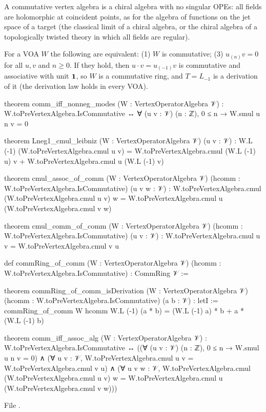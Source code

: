 \begin{physics}
A commutative vertex algebra is a chiral algebra with no singular OPEs: all fields are holomorphic
at coincident points, as for the algebra of functions on the jet space of a target (the classical
limit of a chiral algebra, or the chiral algebra of a topologically twisted theory in which all
fields are regular).
\end{physics}

\begin{theorem}\label{l03:thm:commalg}
For a VOA $W$ the following are equivalent: (1) $W$ is commutative; (3) $u_{(n)}v = 0$ for all
$u,v$ and $n\ge0$. If they hold, then $u\cdot v = u_{(-1)}v$ is commutative and associative with
unit $\mathbf{1}$, so $W$ is a commutative ring, and $T = L_{-1}$ is a derivation of it (the derivation
law holds in every VOA).
\end{theorem}
\begin{leancode}
theorem comm_iff_nonneg_modes (W : VertexOperatorAlgebra 𝒱) :
    W.toPreVertexAlgebra.IsCommutative ↔ ∀ (u v : 𝒱) (n : ℤ), 0 ≤ n → W.smul u n v = 0

theorem Lneg1_cmul_leibniz (W : VertexOperatorAlgebra 𝒱) (u v : 𝒱) :
    W.L (-1) (W.toPreVertexAlgebra.cmul u v)
      = W.toPreVertexAlgebra.cmul (W.L (-1) u) v + W.toPreVertexAlgebra.cmul u (W.L (-1) v)

theorem cmul_assoc_of_comm (W : VertexOperatorAlgebra 𝒱)
    (hcomm : W.toPreVertexAlgebra.IsCommutative) (u v w : 𝒱) :
    W.toPreVertexAlgebra.cmul (W.toPreVertexAlgebra.cmul u v) w
      = W.toPreVertexAlgebra.cmul u (W.toPreVertexAlgebra.cmul v w)

theorem cmul_comm_of_comm (W : VertexOperatorAlgebra 𝒱)
    (hcomm : W.toPreVertexAlgebra.IsCommutative) (u v : 𝒱) :
    W.toPreVertexAlgebra.cmul u v = W.toPreVertexAlgebra.cmul v u

def commRing_of_comm (W : VertexOperatorAlgebra 𝒱)
    (hcomm : W.toPreVertexAlgebra.IsCommutative) : CommRing 𝒱 :=

theorem commRing_of_comm_isDerivation (W : VertexOperatorAlgebra 𝒱)
    (hcomm : W.toPreVertexAlgebra.IsCommutative) (a b : 𝒱) :
    letI := commRing_of_comm W hcomm
    W.L (-1) (a * b) = (W.L (-1) a) * b + a * (W.L (-1) b)

theorem comm_iff_assoc_alg (W : VertexOperatorAlgebra 𝒱) :
    W.toPreVertexAlgebra.IsCommutative ↔
      ((∀ (u v : 𝒱) (n : ℤ), 0 ≤ n → W.smul u n v = 0)
        ∧ (∀ u v : 𝒱, W.toPreVertexAlgebra.cmul u v = W.toPreVertexAlgebra.cmul v u)
        ∧ (∀ u v w : 𝒱, W.toPreVertexAlgebra.cmul (W.toPreVertexAlgebra.cmul u v) w
              = W.toPreVertexAlgebra.cmul u (W.toPreVertexAlgebra.cmul v w)))
\end{leancode}
File .

